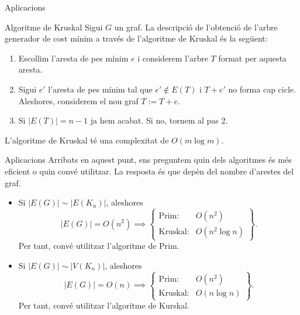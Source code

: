 \documentclass{beamer}
\begin{document}
\begin{frame}{Aplicacions}
    \begin{alertblock}{Algoritme de Kruskal}
Sigui $G$ un graf. La descripció de l'obtenció de l'arbre generador de cost mínim a través de l'algoritme de Kruskal és la següent:
\begin{enumerate}
    \item Escollim l'aresta de pes mínim $e$ i considerem l'arbre $T$ format per aquesta aresta.\pause
    \item Sigui $e'$ l’aresta de pes mínim tal que $e'\notin E(T)$ i $T+e'$ no forma cap cicle. Aleshores, considerem el nou graf $T:=T+e$.\pause
    \item Si $|E(T)|=n-1$ ja hem acabat. Si no, tornem al pas 2.
\end{enumerate}
\end{alertblock}\pause
L’algoritme de Kruskal té una complexitat de $O(m\log m)$.
\end{frame}
\begin{frame}{Aplicacions}
    Arribats en aquest punt, ens preguntem quin dels algoritmes és més eficient o quin convé utilitzar. \pause La resposta és que depèn del nombre d’arestes del graf.\pause
    \begin{itemize}
        \item<3-> Si $|E(G)|\sim |E(K_n)|$, aleshores $$|E(G)|= O(n^2)\implies\left\{\begin{array}{cc}
            \text{Prim:} & O(n^2)\\
            \text{Kruskal:} & O(n^2\log n) 
        \end{array}\right\}.$$\pause Per tant, convé utilitzar l'algoritme de Prim.\pause
        \item<4-> Si $|E(G)|\sim |V(K_n)|$, aleshores $$|E(G)|= O(n)\implies\left\{\begin{array}{cc}
            \text{Prim:} & O(n^2)\\
            \text{Kruskal:} & O(n\log n) 
        \end{array}\right\}.$$\pause Per tant, convé utilitzar l'algoritme de Kurskal.
    \end{itemize}
\end{frame}
\end{document}
